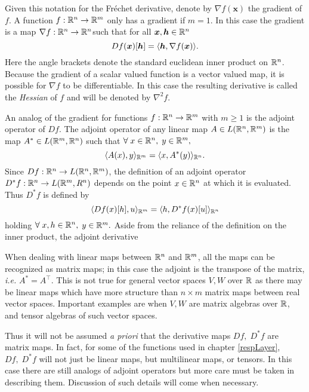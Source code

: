 Given this notation for the Fr\'{e}chet derivative, denote by \( \nabla f(\bm x) \) the gradient of \( f \). A function \( f:\mathbb R^n\rightarrow \mathbb R^m \) only has a gradient if \( m = 1 \). In this case the gradient is a map \( \nabla f:\mathbb R^n\rightarrow\mathbb R^n \)such that for all \( \bm x, \bm h \in \mathbb R^n \)
\begin{equation}\label{eqn:gradDef}
 Df(\bm x)[\bm h] = \langle\bm h, \nabla f(\bm x)\rangle.
\end{equation} 
Here the angle brackets denote the standard euclidean inner product on \( \mathbb R^n \).  Because the gradient of a scalar valued function is a vector valued map, it is possible for \( \nabla f \) to be differentiable. In this case the resulting derivative is called the \textit{Hessian} of \( f \) and will be denoted by \( \nabla^2 f. \) 

An analog of the gradient for functions \( f:\mathbb R^n\rightarrow\mathbb R^m \) with \( m\geq 1 \) is the adjoint operator of \( Df \). The adjoint operator of any linear map \( A\in L(\mathbb R^n,\mathbb R^m) \) is the map \( A^{\ast}\in L(\mathbb R^m,\mathbb R^n) \) such that \( \forall\; x\in\mathbb R^n,\) \(y\in\mathbb R^m, \) 
\[ \langle A(x),y\rangle_{\mathbb R^m} = \langle x,A^{\ast}(y)\rangle_{\mathbb R^n}. \]
Since \( Df:\mathbb R^n\rightarrow L(\mathbb R^n,\mathbb R^m) \), the definition of an adjoint operator \( D^{\ast}f:\mathbb R^n\rightarrow L(\mathbb R^m,R^n)\) depends on the point \( x\in\mathbb R^n \) at which it is evaluated.  Thus \( D^{\ast}f \) is defined by 
\begin{equation*}
\langle Df(x)[h],u\rangle_{\mathbb R^m} = \langle h,D^{\ast}f(x)[u]\rangle_{\mathbb R^n}
\end{equation*}
holding \( \forall\; x,h\in\mathbb R^n,\) \(y\in\mathbb R^m.\) Aside from the reliance of the definition on the inner product, the adjoint derivative 

When dealing with linear maps between \( \mathbb R^n \) and \( \mathbb R^m \), all the maps can be recognized as matrix maps; in this case the adjoint is the transpose of the matrix, \textit{i.e.} \( A^\ast = A^{\intercal} \). This is not true for general vector spaces \( V,W \) over \( \mathbb R \) as there may be linear maps which have more structure than \( n\times m \) matrix maps between real vector spaces. Important examples are when \( V,W \) are matrix algebras over \( \mathbb R \), and tensor algebras of such vector spaces.

Thus it will not be assumed \textit{a priori} that the derivative maps \( Df,\;D^{\ast}f \) are matrix maps.  In fact, for some of the functions used in chapter \ref{respLayer}, \( Df,\;D^{\ast}f \) will not just be linear maps, but multilinear maps, or tensors.  In this case there are still analogs of adjoint operators but more care must be taken in describing them. Discussion of such details will come when necessary.

